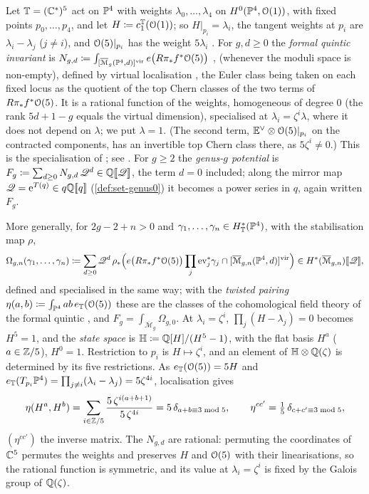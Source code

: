\begin{defn}
\label{def:set-fq}
Let $\mathbb{T}=(\mathbb{C}^*)^5$ act on $\mathbb{P}^4$ with weights $\lambda_0,\dots,\lambda_4$ on $H^0(\mathbb{P}^4,\mathcal{O}(1))$, with fixed points $p_0,\dots,p_4$, and let $H\coloneqq c_1^{\mathbb{T}}(\mathcal{O}(1))$; so $H|_{p_i}=\lambda_i$, the tangent weights at $p_i$ are $\lambda_i-\lambda_j$ ($j\neq i$), and $\mathcal{O}(5)|_{p_i}$ has the weight $5\lambda_i$ \cite[(10)]{LP20}. For $g,d\geq0$ the \emph{formal quintic invariant} is $N_{g,d}\coloneqq\int_{[\overline{\mathcal M}_g(\mathbb{P}^4,d)]^{\mathrm{vir}}}e\bigl(R\pi_*f^*\mathcal{O}(5)\bigr)$ \cite[Section~0.2, (5)]{LP18}, \cite[Section~0.2, (5)]{LP20} (whenever the moduli space is non-empty), defined by virtual localisation \cite{MR1666787}, the Euler class being taken on each fixed locus as the quotient of the top Chern classes of the two terms of $R\pi_*f^*\mathcal{O}(5)$. It is a rational function of the weights, homogeneous of degree $0$ (the rank $5d+1-g$ equals the virtual dimension), specialised at $\lambda_i=\zeta^i\lambda$, where it does not depend on $\lambda$; we put $\lambda=1$. (The second term, $\mathbb{E}^\vee\otimes\mathcal{O}(5)|_{p_i}$ on the contracted components, has an invertible top Chern class there, as $5\zeta^i\neq0$.) This is the specialisation of \cite{ZZ08}; see \cite[Section~3.1, (9)]{GJR18}. For $g\geq2$ the \emph{genus-$g$ potential} is $F_g\coloneqq\sum_{d\geq0}N_{g,d}\,\mathscr{Q}^d\in\mathbb{Q}[\![ \mathscr{Q} ]\!]$, the term $d=0$ included; along the mirror map $\mathscr{Q}=\mathrm{e}^{T(q)}\in q\mathbb{Q}[\![ q ]\!]$ (\cref{def:set-genus0}) it becomes a power series in $q$, again written $F_g$.

More generally, for $2g-2+n>0$ and $\gamma_1,\dots,\gamma_n\in H^*_{\mathbb{T}}(\mathbb{P}^4)$, with the stabilisation map $\rho$,
\[
\Omega_{g,n}(\gamma_1,\dots,\gamma_n)\coloneqq\sum_{d\geq0}\mathscr{Q}^d\,\rho_*\Bigl(e\bigl(R\pi_*f^*\mathcal{O}(5)\bigr)\prod_{j}\mathrm{ev}_j^*\gamma_j\cap[\overline{\mathcal M}_{g,n}(\mathbb{P}^4,d)]^{\mathrm{vir}}\Bigr)\in H^*(\overline{\mathcal M}_{g,n})[\![ \mathscr{Q} ]\!],
\]
defined and specialised in the same way; with the \emph{twisted pairing} $\eta(a,b)\coloneqq\int_{\mathbb{P}^4}ab\,e_{\mathbb{T}}(\mathcal{O}(5))$ these are the classes of the cohomological field theory of the formal quintic \cite[Section~4.1]{GJR18}, and $F_g=\int_{\overline{\mathcal M}_g}\Omega_{g,0}$. At $\lambda_i=\zeta^i$, $\prod_j(H-\lambda_j)=0$ becomes $H^5=1$, and the \emph{state space} is $\mathbb{H}\coloneqq\mathbb{Q}[H]/(H^5-1)$, with the flat basis $H^a$ ($a\in\mathbb{Z}/5$), $H^0=1$. Restriction to $p_i$ is $H\mapsto\zeta^i$, and an element of $\mathbb{H}\otimes\mathbb{Q}(\zeta)$ is determined by its five restrictions. As $e_{\mathbb{T}}(\mathcal{O}(5))=5H$ and $e_{\mathbb{T}}(T_{p_i}\mathbb{P}^4)=\prod_{j\neq i}(\lambda_i-\lambda_j)=5\zeta^{4i}$, localisation gives
\[
\eta(H^a,H^b)=\sum_{i\in\mathbb{Z}/5}\frac{5\,\zeta^{i(a+b+1)}}{5\,\zeta^{4i}}=5\,\delta_{a+b\equiv3\bmod5},\qquad\eta^{cc'}=\tfrac15\,\delta_{c+c'\equiv3\bmod5},
\]
$(\eta^{cc'})$ the inverse matrix. The $N_{g,d}$ are rational: permuting the coordinates of $\mathbb{C}^5$ permutes the weights and preserves $H$ and $\mathcal{O}(5)$ with their linearisations, so the rational function is symmetric, and its value at $\lambda_i=\zeta^i$ is fixed by the Galois group of $\mathbb{Q}(\zeta)$.
\end{defn}

